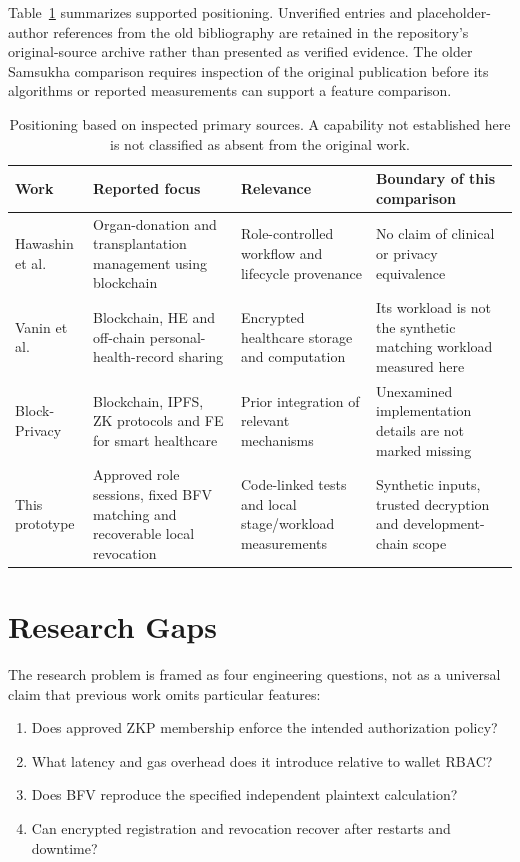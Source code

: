 \documentclass[10pt,twocolumn,a4paper]{article}
\begin{document}
Table~\ref{tab:related} summarizes supported positioning. Unverified entries and
placeholder-author references from the old bibliography are retained in the
repository's original-source archive rather than presented as verified evidence.
The older Samsukha comparison requires inspection of the original publication
before its algorithms or reported measurements can support a feature comparison.

\begin{table}[t]
\centering
\caption{Positioning based on inspected primary sources. A capability not established here is not classified as absent from the original work.}
\label{tab:related}
\scriptsize\renewcommand{\arraystretch}{1.13}
\begin{tabularx}{\textwidth}{>{\raggedright\arraybackslash}p{2.4cm} >{\raggedright\arraybackslash}X >{\raggedright\arraybackslash}X >{\raggedright\arraybackslash}X}
\toprule
Work & Reported focus & Relevance & Boundary of this comparison\\\midrule
Hawashin et al.~\cite{hawashin} & Organ-donation and transplantation management using blockchain & Role-controlled workflow and lifecycle provenance & No claim of clinical or privacy equivalence\\
Vanin et al.~\cite{vanin} & Blockchain, HE and off-chain personal-health-record sharing & Encrypted healthcare storage and computation & Its workload is not the synthetic matching workload measured here\\
Block-Privacy~\cite{egala} & Blockchain, IPFS, ZK protocols and FE for smart healthcare & Prior integration of relevant mechanisms & Unexamined implementation details are not marked missing\\
This prototype & Approved role sessions, fixed BFV matching and recoverable local revocation & Code-linked tests and local stage/workload measurements & Synthetic inputs, trusted decryption and development-chain scope\\
\bottomrule
\end{tabularx}
\end{table}

\section{Research Gaps}
\label{sec:gaps}

The research problem is framed as four engineering questions, not as a universal
claim that previous work omits particular features:
\begin{enumerate}[label=\textbf{RQ\arabic*.}]
\item Does approved ZKP membership enforce the intended authorization policy?
\item What latency and gas overhead does it introduce relative to wallet RBAC?
\item Does BFV reproduce the specified independent plaintext calculation?
\item Can encrypted registration and revocation recover after restarts and downtime?
\end{enumerate}
\end{document}
